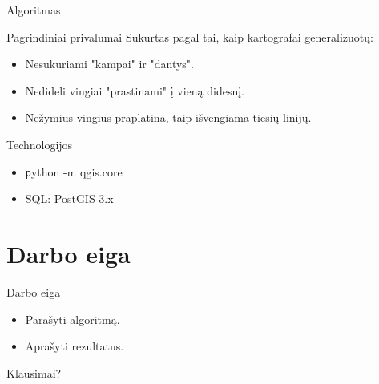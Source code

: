 \documentclass[14pt]{beamer}
\begin{document}
\begin{frame}{Algoritmas}
    \begin{center}
    \end{center}
\end{frame}

\begin{frame}{Pagrindiniai privalumai}
    Sukurtas pagal tai, kaip kartografai generalizuotų:
    \pause
    \begin{itemize}[<+->]
        \item Nesukuriami "kampai" ir "dantys".
        \item Nedideli vingiai "prastinami" į vieną didesnį.
        \item Nežymius vingius praplatina, taip išvengiama tiesių linijų.
    \end{itemize}
\end{frame}

\begin{frame}{Technologijos}
    \begin{itemize}[<+->]
        \item {\texttt python -m qgis.core}
        \item SQL: PostGIS 3.x
    \end{itemize}
\end{frame}

\section{Darbo eiga}

\begin{frame}{Darbo eiga}
    \begin{itemize}[<+->]
        \item Parašyti algoritmą.
        \item Aprašyti rezultatus.
    \end{itemize}
\end{frame}

\begin{frame}{Klausimai?}
\end{frame}
\end{document}
